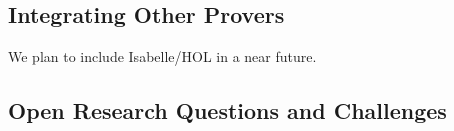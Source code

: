 \documentclass{entcs}
\begin{document}
\subsection{Integrating Other Provers}
We plan to include Isabelle/HOL in a near future.
\subsection{Open Research Questions and Challenges}




%


\end{document}
